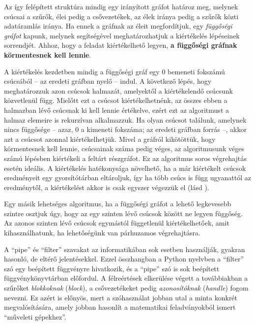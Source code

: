 Az így felépített struktúra mindig egy irányított gráfot határoz meg, melynek csúcsai a szűrők, élei pedig a csővezetékek, az élek iránya pedig a szűrők közti adatáramlás iránya.
Ha ennek a gráfnak az éleit megfordítjuk, egy \textit{függőségi gráfot} kapunk, melynek segítségével meghatározhatjuk a kiértékelés lépéseinek sorrendjét.
Ahhoz, hogy a feladat kiértékelhető legyen, \textbf{a függőségi gráfnak körmentesnek kell lennie}. \cite{wiki:DependencyGraph}

A kiértékelés kezdetben mindig a függőségi gráf egy 0 bemeneti fokszámú csúcsából -- az eredeti gráfban nyelő -- indul.
A következő lépés, hogy meghatározzuk azon csúcsok halmazát, amelyektől a kiértékelendő csúcsunk közvetlenül függ.
Mielőtt ezt a csúcsot kiértékelhetnénk, az összes ebben a halmazban lévő csúcsnak ki kell lennie értékelve, ezért ezt az algoritmust a halmaz elemeire is rekurzívan alkalmazzuk.
Ha olyan csúcsot találunk, amelynek nincs függősége -- azaz, 0 a kimeneti fokszáma; az eredeti gráfban forrás --, akkor azt a csúcsot azonnal kiértékelhetjük.
Mivel a gráfról kikötöttük, hogy körmentesnek kell lennie, csúcsainak száma pedig véges, az algoritmusunk véges számú lépésben kiértékeli a feltárt részgráfot.
Ez az algoritmus soros végrehajtás esetén ideális.
A kiértékelés hatékonysága növelhető, ha a már kiértékelt csúcsok eredményeit egy gyorsítótárban eltároljuk, így ha több csúcs is függ ugyanattól az eredménytől, a kiértékelést akkor is csak egyszer végezzük el (lásd \cite{wiki:Memoization}).

Egy másik lehetséges algoritmus, ha a függőségi gráfot a lehető legkevesebb szintre osztjuk úgy, hogy az egy szinten lévő csúcsok között ne legyen függőség.
Az azonos szinten lévő csúcsok egymástól függetlenül kiértékelhetőek, amit kihasználhatunk, ha lehetőségünk van párhuzamos végrehajtásra.

A ``pipe'' és ``filter'' szavakat az informatikában sok esetben használják, gyakran hasonló, de eltérő jelentésekkel.
Ezzel összhangban a Python nyelvben a ``filter'' szó egy beépített függvényre hivatkozik, és a ``pipe'' szó is sok beépített függvénykönyvtárban előfordul.
A félreértések elkerülése végett a továbbiakban a szűrőket \textit{blokkoknak} (\textit{block}), a csővezetékeket pedig \textit{azonosítóknak} (\textit{handle}) fogom nevezni.
Ez azért is előnyös, mert a szóhasználat jobban utal a minta konkrét megvalósítására, amely jobban hasonlít a matematikai feladványokból ismert ``műveleti gépekhez''.

